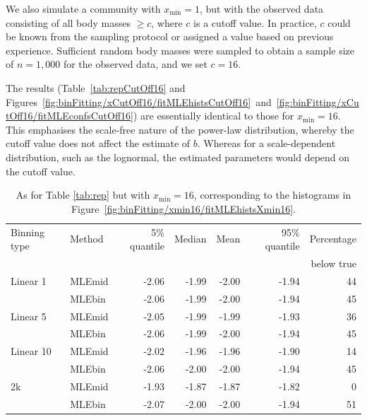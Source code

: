 \documentclass[12pt, letter]{article}
\newcommand{\xmin}{x_{\mathrm{min}}}
\newcommand{\fitMLEhistsXminSixteen}{\ref{fig:binFitting/xmin16/fitMLEhistsXmin16}}
\newcommand{\fitMLEhistsCutOffSixteen}{\ref{fig:binFitting/xCutOff16/fitMLEhistsCutOff16}}
\newcommand{\fitMLEconfsCutOffSixteen}{\ref{fig:binFitting/xCutOff16/fitMLEconfsCutOff16}}
\begin{document}
We also simulate a community with $\xmin=1$, but with the observed data
consisting of all body masses $\geq c$, where $c$
is a cutoff value. In practice, $c$ could be known from the sampling protocol or
assigned a value based on previous experience. Sufficient random body masses
were sampled to obtain a sample size of $n=1,000$ for the observed data, and we
set $c=16$.

The results (Table~\ref{tab:repCutOff16} and Figures~\fitMLEhistsCutOffSixteen\
and~\fitMLEconfsCutOffSixteen) are essentially identical to those for $\xmin=16$.
This emphasises the scale-free nature of the power-law
distribution, whereby the cutoff value does not affect the estimate of $b$.
Whereas for a scale-dependent distribution, such as the lognormal,
the estimated parameters would depend on the cutoff value.

\begin{table}
\caption{\label{tab:repXmin16} As for Table \ref{tab:rep} but with $\xmin = 16$,
  corresponding to the histograms in Figure~\fitMLEhistsXminSixteen .}
\rowcolors{3}{}{lightgray}
\begin{tabular}{llrrrrr}
\hline Binning type & Method & 5\% quantile & Median & Mean & 95\% quantile &
Percentage\\ & & & & & & below true\\ \hline Linear 1 & MLEmid & -2.06 & -1.99 &
-2.00 & -1.94 & 44 \\ & MLEbin & -2.06 & -1.99 & -2.00 & -1.94 & 45 \\ Linear 5
& MLEmid & -2.05 & -1.99 & -1.99 & -1.93 & 36 \\ & MLEbin & -2.06 & -1.99 &
-2.00 & -1.94 & 45 \\ Linear 10 & MLEmid & -2.02 & -1.96 & -1.96 & -1.90 & 14
\\ & MLEbin & -2.06 & -2.00 & -2.00 & -1.94 & 45 \\ 2k & MLEmid & -1.93 & -1.87
& -1.87 & -1.82 & 0 \\ & MLEbin & -2.07 & -2.00 & -2.00 & -1.94 & 51 \\ \hline
\end{tabular}
\end{table}
\end{document}

